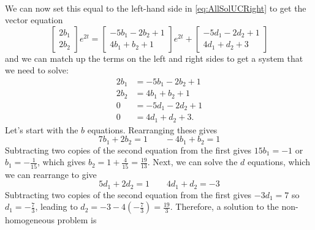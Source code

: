 \documentclass{ximera}
\begin{document}
\begin{exampleSol}
\begin{enumerate}
\begin{equation*}
\begin{split}
                \end{split}
            \end{equation*}
            We can now set this equal to the left-hand side in \eqref{eq:AllSolUCRight} to get the vector equation
            \begin{equation*}
                \begin{bmatrix} 2b_1 \\ 2b_2 \end{bmatrix} e^{2t} = \begin{bmatrix} -5b_1 - 2b_2 + 1 \\ 4b_1 + b_2 + 1 \end{bmatrix}e^{2t} + \begin{bmatrix} -5d_1 - 2d_2 + 1\\ 4d_1 + d_2 + 3 \end{bmatrix}
            \end{equation*}
            and we can match up the terms on the left and right sides to get a system that we need to solve:
            \begin{equation*}
                \begin{split}
                    2b_1 &= -5b_1 - 2b_2 + 1 \\
                    2b_2 &= 4b_1 + b_2 + 1 \\
                    0 &= -5d_1- 2d_2 + 1 \\
                    0 &= 4d_1 + d_2 + 3.
                \end{split}
            \end{equation*}
            Let's start with the $b$ equations. Rearranging these gives
            \begin{equation*}
                7b_1 + 2b_2 = 1 \qquad -4b_1 + b_2 = 1
            \end{equation*}
            Subtracting two copies of the second equation from the first gives $15b_1 = -1$ or $b_1 = -\frac{1}{15}$, which gives $b_2 = 1 + \frac{4}{15} = \frac{19}{13}$. Next, we can solve the $d$ equations, which we can rearrange to give
            \begin{equation*}
                5d_1 + 2d_2 = 1 \qquad 4d_1 + d_2 = -3
            \end{equation*} 
            Subtracting two copies of the second equation from the first gives $-3d_1 = 7$ so $d_1 = -\frac{7}{3}$, leading to $d_2 = -3 - 4(-\frac{7}{3}) = \frac{19}{3}$. Therefore, a solution to the non-homogeneous problem is
            \begin{equation*}

\end{equation*}
\end{enumerate}
\end{exampleSol}
\end{document}
